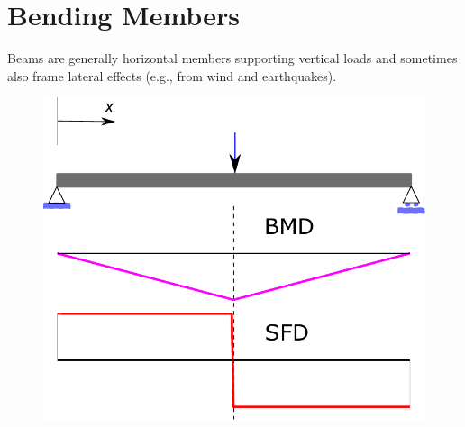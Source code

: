 \chapter{Bending Members}
Beams are generally horizontal members supporting vertical loads and sometimes also frame lateral effects (e.g., from wind and earthquakes).
\begin{figure}[H]
\centering\includegraphics{PIC/CH05/BM}
\end{figure}
